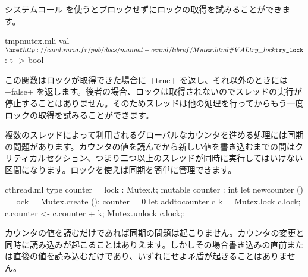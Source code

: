 システムコール  を使うとブロックせずにロックの取得を試みることができます。
%
\begin{listingcodefile}{tmpmutex.mli}
val $\libvalue{Mutex}{try\_lock}$ : t -> bool
\end{listingcodefile}
%
この関数はロックが取得できた場合に \ml+true+ を返し、それ以外のときには \ml+false+ を返します。後者の場合、ロックは取得されないのでスレッドの実行が停止することはありません。そのためスレッドは他の処理を行ってからもう一度ロックの取得を試みることができます。

\begin{example}

複数のスレッドによって利用されるグローバルなカウンタを進める処理には同期の問題があります。カウンタの値を読んでから新しい値を書き込むまでの間はクリティカルセクション、つまり二つ以上のスレッドが同時に実行してはいけない区間になります。ロックを使えば同期を簡単に管理できます。
%
\begin{listingcodefile}{cthread.ml}
type counter = { lock : Mutex.t; mutable counter : int }
let newcounter () = { lock = Mutex.create (); counter = 0 }
let addtocounter c k =
  Mutex.lock c.lock;
  c.counter <- c.counter + k;
  Mutex.unlock c.lock;;
\end{listingcodefile}
%
カウンタの値を読むだけであれば同期の問題は起こりません。カウンタの変更と同時に読み込みが起こることはありえます。しかしその場合書き込みの直前または直後の値を読み込むだけであり、いずれにせよ矛盾が起きることはありません。
\end{example}

